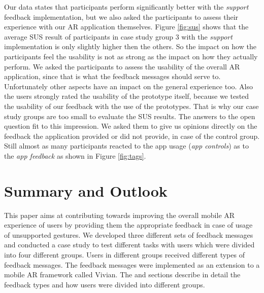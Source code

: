 \documentclass[11pt, a4paper]{article}
\begin{document}
			Our data states that participants perform significantly better with the \emph{support} feedback implementation, but we also asked the participants to assess their experience with our \ac{AR} application themselves. Figure \ref{fig:sus} shows that the average \ac{SUS} result of participants in case study group 3 with the \emph{support} implementation is only slightly higher then the others. So the impact on how the participants feel the usability is not as strong as the impact on how they actually perform. We asked the participants to assess the usability of the overall AR application, since that is what the feedback messages should serve to. Unfortunately other aspects have an impact on the general experience too. Also the users strongly rated the usability of the prototype itself, because we tested the usability of our feedback with the use of the prototypes. That is why our case study groups are too small to evaluate the \ac{SUS} results. The answers to the open question fit to this impression. We asked them to give us opinions directly on the feedback the application provided or did not provide, in case of the control group. Still almost as many participants reacted to the app usage (\emph{app controls}) as to the \emph{app feedback} as shown in Figure \ref{fig:tags}.
			




	\section*{Summary and Outlook}\label{sec:summary}
		This paper aims at contributing towards improving the overall mobile \ac{AR} experience of users by providing them the appropriate feedback in case of usage of unsupported gestures. We developed three different sets of feedback messages and conducted a case study to test different tasks with users which were divided into four different groups. Users in different groups received different types of feedback messages. The feedback messages were implemented as an extension to a mobile \ac{AR} framework called Vivian. The  and  sections describe in detail the feedback types and how users were divided into different groups.
		
\end{document}
